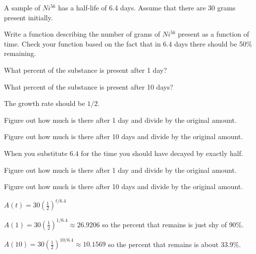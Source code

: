 \begin{activity}\label{A:0.2.2}
    A sample of $Ni^{56}$ has a half-life of 6.4 days.  Assume that there are 30 grams
    present initially.
    \ba
        \item Write a function describing the number of grams of $Ni^{56}$ present as a
            function of time.  Check your function based on the fact that in 6.4 days
            there should be 50\% remaining.
        \item What percent of the substance is present after 1 day?
        \item What percent of the substance is present after 10 days?
    \ea
\end{activity}
\begin{smallhint}
   \ba
        \item The growth rate should be $1/2$.
        \item Figure out how much is there after 1 day and divide by the original amount.
        \item Figure out how much is there after 10 days and divide by the original amount.
   \ea
\end{smallhint}
\begin{bighint}
   \ba
        \item When you substitute $6.4$ for the time you should have decayed by exactly
            half.
        \item Figure out how much is there after 1 day and divide by the original amount.
        \item Figure out how much is there after 10 days and divide by the original amount.
   \ea
\end{bighint}
\begin{activitySolution}
   \ba
        \item $A(t) = 30 \left( \frac{1}{2}  \right)^{t/6.4}$
        \item $A(1) =  30 \left( \frac{1}{2}  \right)^{1/6.4} \approx 26.9206$ so the
            percent that remains is just shy of 90\%.
        \item $A(10) =  30 \left( \frac{1}{2}  \right)^{10/6.4} \approx 10.1569$ so the
            percent that remains is about 33.9\%.
   \ea
\end{activitySolution}

\aftera
